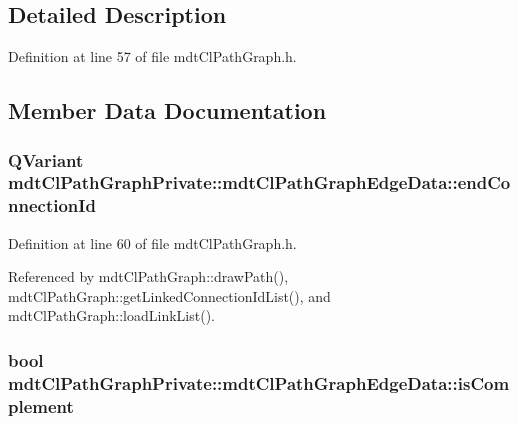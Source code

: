\subsection{Detailed Description}


Definition at line 57 of file mdt\-Cl\-Path\-Graph.\-h.



\subsection{Member Data Documentation}
\hypertarget{structmdt_cl_path_graph_private_1_1mdt_cl_path_graph_edge_data_a6dfdd2c68bdec4556ab367517737b7a1}{
\subsubsection[{end\-Connection\-Id}]{\setlength{\rightskip}{0pt plus 5cm}Q\-Variant mdt\-Cl\-Path\-Graph\-Private\-::mdt\-Cl\-Path\-Graph\-Edge\-Data\-::end\-Connection\-Id}}\label{structmdt_cl_path_graph_private_1_1mdt_cl_path_graph_edge_data_a6dfdd2c68bdec4556ab367517737b7a1}


Definition at line 60 of file mdt\-Cl\-Path\-Graph.\-h.



Referenced by mdt\-Cl\-Path\-Graph\-::draw\-Path(), mdt\-Cl\-Path\-Graph\-::get\-Linked\-Connection\-Id\-List(), and mdt\-Cl\-Path\-Graph\-::load\-Link\-List().

\hypertarget{structmdt_cl_path_graph_private_1_1mdt_cl_path_graph_edge_data_a423302ffa14fedbb80f362f9f44960d7}{
\subsubsection[{is\-Complement}]{\setlength{\rightskip}{0pt plus 5cm}bool mdt\-Cl\-Path\-Graph\-Private\-::mdt\-Cl\-Path\-Graph\-Edge\-Data\-::is\-Complement}}\label{structmdt_cl_path_graph_private_1_1mdt_cl_path_graph_edge_data_a423302ffa14fedbb80f362f9f44960d7}


